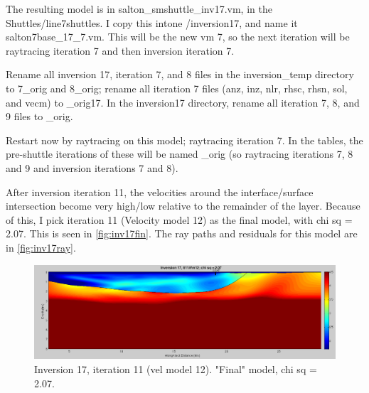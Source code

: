 \documentclass[fontsize=11pt, %
                             paper=a4, %
                             twoside, %
                             captions=tableheading,
                             index=totoc,
                             hyperref]{labbook}
\begin{document}
\begin{addmargin}[4cm]{0cm}
The resulting model is in salton\_smshuttle\_inv17.vm, in the Shuttles/line7shuttles.  I copy this intone /inversion17, and name it salton7base\_17\_7.vm.  This will be the new vm 7, so the next iteration will be raytracing iteration 7 and then inversion iteration 7.  

Rename all inversion 17, iteration 7, and 8 files in the inversion\_temp directory to 7\_orig and 8\_orig; rename all iteration 7 files (anz, inz, nlr, rhsc, rhsn, sol, and vecm) to \_orig17.
In the inversion17 directory, rename all iteration 7, 8, and 9 files to \_orig.

Restart now by raytracing on this model; raytracing iteration 7.  In the tables, the pre-shuttle iterations of these will be named \_orig (so raytracing iterations 7, 8 and 9 and inversion iterations 7 and 8).

After inversion iteration 11, the velocities around the interface/surface intersection become very high/low relative to the remainder of the layer.  Because of this, I pick iteration 11 (Velocity model 12) as the final model, with chi sq = 2.07.  This is seen in \autoref{fig:inv17fin}.  The ray paths and residuals for this model are in \autoref{fig:inv17ray}.


\begin{figure}[h!]
\raggedleft
\includegraphics[scale=0.35,keepaspectratio=true]{figs/Inv17final.png}
\caption{Inversion 17, iteration 11 (vel model 12).  "Final" model, chi sq = 2.07.}
\label{fig:inv17fin}
\end{figure}


\end{addmargin}
\end{document}
